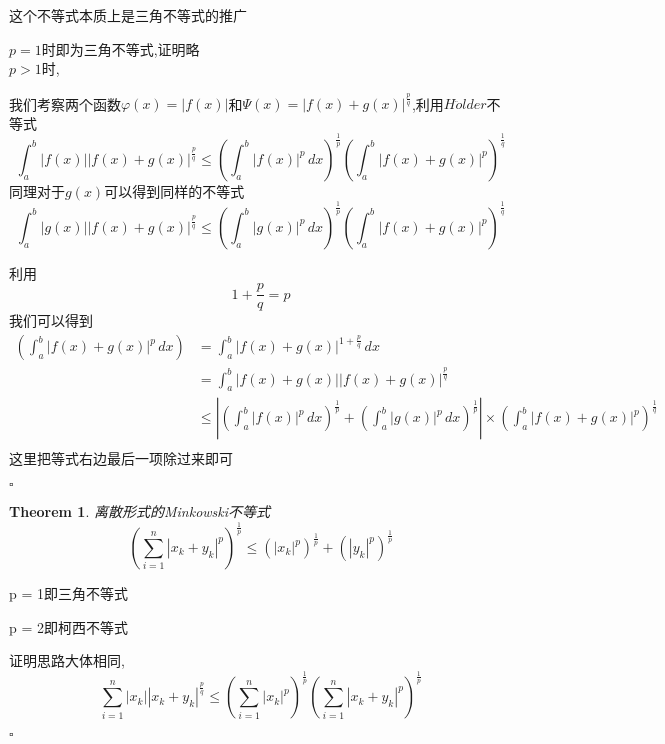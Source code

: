 \documentclass[11pt,hyperref,a4paper,UTF8]{ctexart}
\newtheorem{theorem}{Theorem}[subsection]
\newenvironment{cproof}{%
\heiti{证明}\kaishu
}{%
  \hfill $\square$
  \par\bigskip
}
\newcommand{\parameter}[1]{\left(#1\right)}
\newcommand{\abs}[1]{\left|#1\right|}
\begin{document}
\begin{CJK}{UTF8}{gkai}
这个不等式本质上是三角不等式的推广

\begin{cproof}

$p = 1$时即为三角不等式,证明略\\

$p > 1$时,

我们考察两个函数$\varphi(x) = |f(x)|$和$\varPsi(x) = \abs{f(x) + g(x)}^{\frac{p}{q}}$,利用$H\ddot{o}lder$不等式
\begin{equation}
  \int_{a}^{b}\abs{f(x)}\abs{f(x)+ g(x)}^{\frac{p}{q}} \leq \parameter{\int_{a}^{b}\abs{f(x)}^p\, dx}^{\frac{1}{p}} \parameter{\int_{a}^{b}\abs{f(x) + g(x)}^p}^{\frac{1}{q}}
\end{equation}
  同理对于$g(x)$可以得到同样的不等式
\begin{equation}
  \int_{a}^{b}\abs{g(x)}\abs{f(x)+ g(x)}^{\frac{p}{q}} \leq \parameter{\int_{a}^{b}\abs{g(x)}^p\, dx}^{\frac{1}{p}} \parameter{\int_{a}^{b}\abs{f(x) + g(x)}^p}^{\frac{1}{q}}
\end{equation}

利用\[1 + \dfrac{p}{q} = p\]
我们可以得到
\[
\begin{aligned}
  \parameter{\int_{a}^{b} \abs{f(x) + g(x)}^p\, dx} &= \int_{a}^{b}\abs{f(x) + g(x)}^{1 + \frac{p}{q}}\,dx \\
  &= \int_{a}^{b}\abs{f(x) + g(x)}\abs{f(x)+ g(x)}^{\frac{p}{q}} \\
  &\leq \abs{\parameter{\int_{a}^{b}\abs{f(x)}^p\, dx}^{\frac{1}{p}} + \parameter{\int_{a}^{b}\abs{g(x)}^p\, dx}^{\frac{1}{p}} }\times \parameter{\int_{a}^{b}\abs{f(x) + g(x)}^p}^{\frac{1}{q}}\\
\end{aligned}  
  \]
  这里把等式右边最后一项除过来即可
  

\end{cproof}

\begin{theorem}
  离散形式的Minkowski不等式
  \[\parameter{\sum_{i = 1}^{n} \abs{x_k + y_k}^p}^{\frac{1}{p}} \leq \parameter{\abs{x_k}^p}^{\frac{1}{p}} + \parameter{\abs{y_k}^p}^{\frac{1}{p}}\]
\end{theorem}

p = 1即三角不等式

p = 2即柯西不等式

\begin{cproof}
证明思路大体相同,
\[\sum_{i = 1}^{n}\abs{x_k}\abs{x_k + y_k}^{\frac{p}{q}} \leq \parameter{\sum_{i = 1}^{n} \abs{x_k}^p}^{\frac{1}{p}}
\parameter{\sum_{i = 1}^{n} \abs{x_k + y_k}^p}^{\frac{1}{p}}\]


\end{cproof}
\end{CJK}
\end{document}
